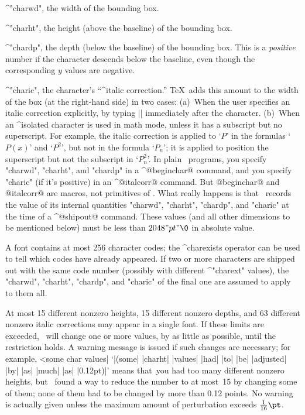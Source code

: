 \smallskip
\item\bull ^"charwd", the width of the bounding box.
\item\bull ^"charht", the height (above the baseline) of the bounding box.
\item\bull ^"chardp", the depth (below the baseline) of the bounding box.
This is a {\sl positive\/} number if the character descends below the
baseline, even though the corresponding $y$ values are negative.
\item\bull ^"charic", the character's ``^{italic correction}.'' \TeX\
adds this amount to the width of the box (at the right-hand side)
in two cases: (a)~When the user specifies an italic correction explicitly,
by typing |\/| immediately after the character. (b)~When an ^{isolated}
character is used in math mode, unless it has a subscript but no
superscript. For example, the italic correction is applied to `$P$' in
the formulas `$P(x)$' and `$P^2$', but not in the formula `$P_n$';
it is applied to position the superscript but not the subscript
in `$P_n^2$'.
\smallskip\noindent
In plain \MF\ programs, you specify "charwd", "charht", and "chardp"
in a ^@beginchar@ command, and you specify "charic" (if it's positive)
in an ^@italcorr@ command. But @beginchar@ and @italcorr@ are macros,
not primitives of \MF\!\null. What really happens is that \MF\ records the
value of its internal quantities "charwd", "charht", "chardp", and "charic"
at the time of a ^@shipout@ command. These values (and all other
dimensions to be mentioned below) must be less than $2048"pt"\0$ in
absolute value.

A font contains at most 256 character codes; the ^{charexists} operator
can be used to tell which codes have already appeared. If two or more
characters are shipped out with the same code number (possibly with
different ^"charext" values), the "charwd",
"charht", "chardp", and "charic" of the final one are assumed to
apply to them all.

At most 15 different nonzero heights, 15 different nonzero depths,
and 63 different nonzero italic corrections may appear in a single
font. If these limits are exceeded, \MF\ will change one or more
values, by as little as possible, until the restriction holds.
A warning message is issued if such changes are necessary; for example,
^^|some char values|
`|(some| |charht| |values| |had| |to| |be| |adjusted| |by| |as| |much|
|as| |0.12pt)|' means that~you had too many different nonzero heights, but
\MF\ found a way to reduce the number to at most~15 by changing some of
them; none of them had to be changed by more than 0.12 points. No warning
is actually given unless the maximum amount of perturbation exceeds
${1\over16}\pt$.

